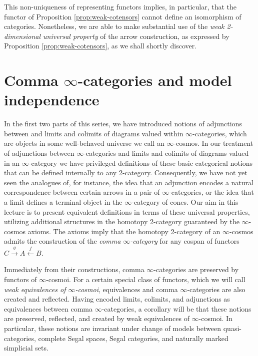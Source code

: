 \documentclass[12pt,reqno]{amsart}
\theoremstyle{plain}
\theoremstyle{definition}
\theoremstyle{remark}
\numberwithin{equation}{subsection}
\begin{document}
This non-uniqueness of representing functors implies, in particular, that the functor of Proposition \ref{prop:weak-cotensors} cannot define an isomorphism of categories. Nonetheless, we are able to make substantial  use of the \emph{weak 2-dimensional universal property} of the arrow construction, as expressed by Proposition \ref{prop:weak-cotensors}, as we shall shortly discover.

\renewcommand\thesection{\bf Lecture~\arabic{section}}
\section{Comma \texorpdfstring{$\infty$}{infinity}-categories and model independence}\label{sec:comma}
\renewcommand\thesection{\arabic{section}}


In the first two parts of this series, we have introduced notions of adjunctions between and limits and colimits of diagrams valued within $\infty$-categories, which are objects in some well-behaved universe we call an $\infty$-cosmos. In our treatment of adjunctions between $\infty$-categories and limits and colimits of diagrams valued in an $\infty$-category we have privileged definitions of these basic categorical notions that can be defined internally to any 2-category. Consequently, we have not yet seen the analogues of, for instance, the idea that an adjunction encodes a natural correspondence between certain arrows in a pair of $\infty$-categories, or the idea that a limit defines a terminal object in the $\infty$-category of cones. Our aim in this lecture is to present equivalent definitions in terms of these universal properties, utilizing additional structures in the homotopy 2-category guaranteed by  the $\infty$-cosmos axioms. The axioms imply that the homotopy 2-category of an $\infty$-cosmos admits the construction of the \emph{comma $\infty$-category} for any cospan of functors $C \xrightarrow{g} A \xleftarrow{f} B$. 

Immediately from their constructions, comma $\infty$-categories are preserved by functors of $\infty$-cosmoi. For a certain special class of functors, which we will call \emph{weak equivalences of $\infty$-cosmoi}, equivalences and comma $\infty$-categories are also created and reflected. Having encoded limits, colimits, and adjunctions as equivalences between comma $\infty$-categories, a corollary will be that these notions are preserved, reflected, and created by weak equivalences of $\infty$-cosmoi. In particular, these notions are invariant under change of models between quasi-categories, complete Segal spaces, Segal categories, and naturally marked simplicial sets.
\end{document}
